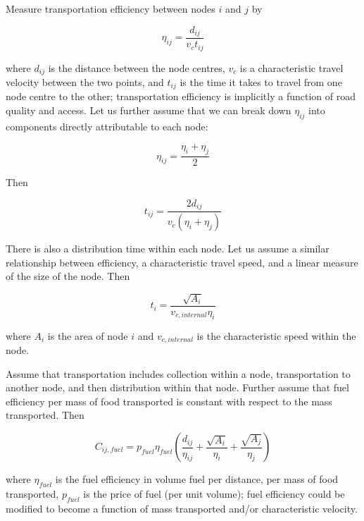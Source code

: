\documentclass[letter,12pt]{article}
\begin{document}
Measure transportation efficiency between nodes $i$ and $j$ by

\begin{equation}
\eta_{ij} = \frac{d_{ij}}{v_c t_{ij}}
\end{equation}

\noindent where $d_{ij}$ is the distance between the node centres, $v_c$ is a characteristic travel velocity between the two points, and $t_{ij}$ is the time it takes to travel from one node centre to the other; transportation efficiency is implicitly a function of road quality and access.  Let us further assume that we can break down $\eta_{ij}$ into components directly attributable to each node:

\begin{equation}
\eta_{ij} = \frac{\eta_i + \eta_j}{2}
\end{equation}

Then

\begin{equation}
t_{ij} = \frac{2d_{ij}}{v_c \left(\eta_i + \eta_j\right)}
\end{equation}

There is also a distribution time within each node.  Let us assume a similar relationship between efficiency, a characteristic travel speed, and a linear measure of the size of the node.  Then

\begin{equation}
t_i = \frac{\sqrt{A_i}}{v_{c,internal} \eta_i}
\end{equation}

\noindent where $A_i$ is the area of node $i$ and $v_{c,internal}$ is the characteristic speed within the node.

Assume that transportation includes collection within a node, transportation to another node, and then distribution within that node.  Further assume that fuel efficiency per mass of food transported is constant with respect to the mass transported.  Then

\begin{equation}
C_{ij,fuel} = p_{fuel} \eta_{fuel} \left(\frac{d_{ij}}{\eta_{ij}} + \frac{\sqrt{A_i}}{\eta_{i}} + \frac{\sqrt{A_j}}{\eta_{j}} \right)
\end{equation}

\noindent where $\eta_{fuel}$ is the fuel efficiency in volume fuel per distance, per mass of food transported, $p_{fuel}$ is the price of fuel (per unit volume); fuel efficiency could be modified to become a function of mass transported and/or characteristic velocity.
\end{document}
